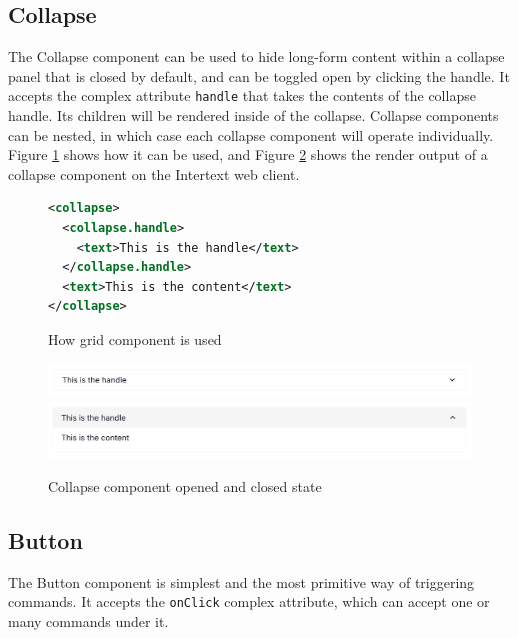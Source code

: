 \subsection{Collapse}

The Collapse component can be used to hide long-form content within a collapse panel that is closed by default, and can be toggled open by clicking the handle. It accepts the complex attribute \texttt{handle} that takes the contents of the collapse handle. Its children will be rendered inside of the collapse. Collapse components can be nested, in which case each collapse component will operate individually. Figure \ref{fig:collapse_xml} shows how it can be used, and Figure \ref{fig:collapse} shows the render output of a collapse component on the Intertext web client.

\begin{figure}
\begin{minipage}{\linewidth}
\begin{lstlisting}[language=xml]
<collapse>
  <collapse.handle>
    <text>This is the handle</text>
  </collapse.handle>
  <text>This is the content</text>
</collapse>
\end{lstlisting}
\end{minipage}
\caption{How grid component is used}%
\label{fig:collapse_xml}%
\end{figure}

\begin{figure}
  \centering
  \includegraphics[width=13cm]{thesis/paper/images/collapse_closed.png}
  \includegraphics[width=13cm]{thesis/paper/images/collapse_open.png}
  \caption{Collapse component opened and closed state}%
  \label{fig:collapse}%
\end{figure}

\subsection{Button}

The Button component is simplest and the most primitive way of triggering commands. It accepts the \texttt{onClick} complex attribute, which can accept one or many commands under it.

